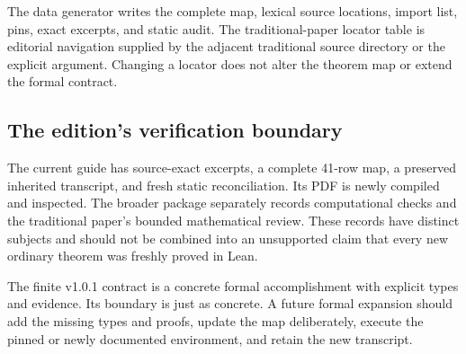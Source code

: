 The data generator writes the complete map, lexical source locations, import list, pins, exact excerpts, and static audit. The traditional-paper locator table is editorial navigation supplied by the adjacent traditional source directory or the explicit  argument. Changing a locator does not alter the theorem map or extend the formal contract.

\subsection{The edition's verification boundary}
The current guide has source-exact excerpts, a complete 41-row map, a preserved inherited transcript, and fresh static reconciliation. Its PDF is newly compiled and inspected. The broader package separately records computational checks and the traditional paper's bounded mathematical review. These records have distinct subjects and should not be combined into an unsupported claim that every new ordinary theorem was freshly proved in Lean.

The finite v1.0.1 contract is a concrete formal accomplishment with explicit types and evidence. Its boundary is just as concrete. A future formal expansion should add the missing types and proofs, update the map deliberately, execute the pinned or newly documented environment, and retain the new transcript.
